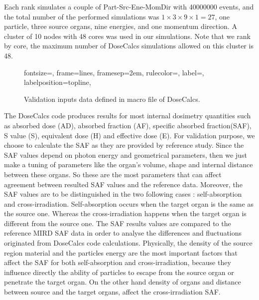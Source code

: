 \documentclass[letterpaper,12pt]{article}
\begin{document}
Each rank simulates a couple of Part-Src-Ene-MomDir with 40000000 events, and the total number of the performed simulations was $1\times3\times9\times1 = 27$, one particle, three source organs, nine energies, and one momentum direction. A cluster of 10 nodes with 48 cores was used in our simulations. Note that we rank by core, the maximum number of DoseCalcs simulations allowed on this cluster is 48. 

\begin{figure}[H] 
\centering
\begin{adjustbox}{max width=\linewidth, margin= 5 , bgcolor = ColorTextFile ,  margin= 1, bgcolor = black}
  {fontsize=\footnotesize,
  frame=lines,
  framesep=2em,
  rulecolor=\color{Gray},
  label=,
  labelposition=topline,
  }
\end{adjustbox}
  \caption{Validation inputs data defined in macro file of DoseCalcs.} 
  \label{macroFile}
\end{figure}

The DoseCalcs code produces results for most internal dosimetry quantities such as absorbed dose (AD), absorbed fraction (AF), specific absorbed fraction(SAF), S value (S), equivalent dose (H) and effective dose (E). For validation purpose, we choose to calculate the SAF as they are provided by reference study. Since the SAF values depend on photon energy and geometrical parameters, then we just make a tuning of parameters like the organ's volume, shape and internal distance between these organs. So these are the most parameters that can affect agreement between resulted SAF values and the reference data. Moreover, the SAF values are to be distinguished in the two following cases : self-absorption and cross-irradiation. Self-absorption occurs when the target organ is the same as the source one. Whereas the cross-irradiation happens when the target organ is different from the source one. The SAF results values are compared to the reference MIRD SAF data \cite{MIRDRefPhantomData} in order to analyse the differences and fluctuations originated from DoseCalcs code calculations. Physically, the density of the source region material and the particles energy are the most important factors that affect the SAF for both self-absorption and cross-irradiation, because they influence directly the ability of particles to escape from the source organ or penetrate the target organ. On the other hand density of organs and distance between source and the target organs, affect the cross-irradiation SAF.
\end{document}
